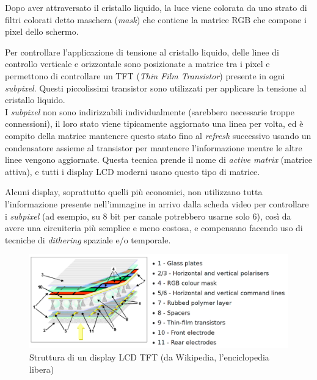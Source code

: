 Dopo aver attraversato il cristallo liquido, la luce viene colorata da uno strato di filtri colorati detto maschera (\textit{mask}) che contiene la matrice RGB che compone i pixel dello schermo.

Per controllare l'applicazione di tensione al cristallo liquido, delle linee di controllo verticale e orizzontale sono posizionate a matrice tra i pixel e permettono di controllare un TFT (\textit{Thin Film Transistor}) presente in ogni \textit{subpixel}. Questi piccolissimi transistor sono utilizzati per applicare la tensione al cristallo liquido\cite{lcdevolution}.\\
I \textit{subpixel} non sono indirizzabili individualmente (sarebbero necessarie troppe connessioni), il loro stato viene tipicamente aggiornato una linea per volta, ed è compito della matrice mantenere questo stato fino al \textit{refresh} successivo usando un condensatore assieme al transistor per mantenere l'informazione mentre le altre linee vengono aggiornate. Questa tecnica prende il nome di \textit{active matrix}\cite{lcdevolution} (matrice attiva), e tutti i display LCD moderni usano questo tipo di matrice.

Alcuni display, soprattutto quelli più economici, non utilizzano tutta l'informazione presente nell'immagine in arrivo dalla scheda video per controllare i \textit{subpixel} (ad esempio, su 8 bit per canale potrebbero usarne solo 6), così da avere una circuiteria più semplice e meno costosa, e compensano facendo uso di tecniche di \textit{dithering} spaziale e/o temporale.

\begin{figure}[h]
	\centering
	\includegraphics[width=\textwidth]{Introduzione_files/lcdtft.png}
	\caption{Struttura di un display LCD TFT (da Wikipedia, l'enciclopedia libera)}
	\label{fig:lcdtft}
\end{figure}

